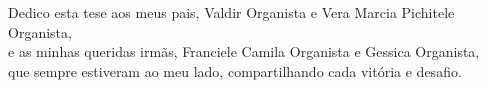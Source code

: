 











Dedico esta tese aos meus pais, Valdir Organista e Vera Marcia Pichitele Organista,\\ e as minhas queridas irmãs, Franciele Camila Organista e Gessica Organista,\\ que sempre estiveram ao meu lado, compartilhando cada vitória e desafio.
